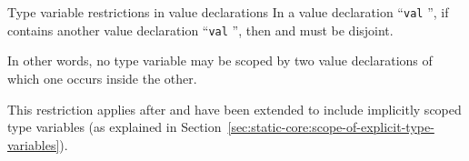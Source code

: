 \begin{clause}{Type variable restrictions in value declarations}\label{clause:syntax-core:type-variable-restrictions-in-value-declarations}
In a value declaration ``\texttt{val}  '', if
 contains another value declaration ``\texttt{val} 
'', then  and  must be disjoint.

In other words, no type variable may be scoped by two value declarations
of which one occurs inside the other.

This restriction applies after  and  have been
extended to include implicitly scoped type variables (as explained in
Section~\ref{sec:static-core:scope-of-explicit-type-variables}).
\end{clause}
